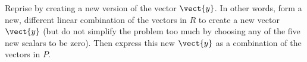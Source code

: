 Reprise  by creating a new version of the vector $\vect{y}$.  In other words, form a new, different linear combination of the vectors in $R$ to create a new vector $\vect{y}$ (but do not simplify the problem too much by choosing any of the five new scalars to be zero).  Then express this new $\vect{y}$ as a combination of the vectors in $P$.